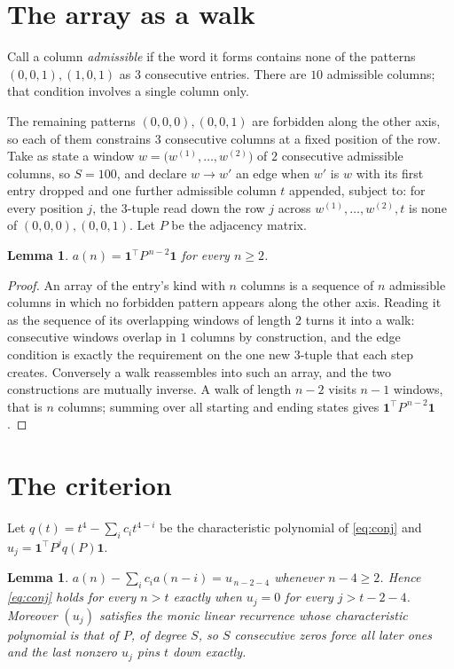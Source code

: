 \documentclass[11pt,a4paper]{article}
\theoremstyle{plain}
\newtheorem{lemma}[theorem]{Lemma}
\theoremstyle{definition}
\begin{document}
\section{The array as a walk}

Call a column \emph{admissible} if the word it forms contains none of the patterns
$(0,0,1), (1,0,1)$ as $3$ consecutive entries. There are $10$ admissible columns; that condition
involves a single column only.

The remaining patterns $(0,0,0), (0,0,1)$ are forbidden along the other axis, so each of them
constrains $3$ consecutive columns at a fixed position of the row. Take as state a
window $w=\bigl(w^{(1)},\dots,w^{(2)}\bigr)$ of $2$ consecutive admissible
columns, so $S=100$, and declare $w\to w'$ an edge when $w'$ is $w$ with its first entry
dropped and one further admissible column $t$ appended, subject to: for every position
$j$, the $3$-tuple read down the row $j$ across $w^{(1)},\dots,w^{(2)},t$
is none of $(0,0,0), (0,0,1)$. Let $P$ be the adjacency matrix.

\begin{lemma}\label{lem:walk}
$a(n)=\mathbf{1}^{\!\top}P^{\,n-2}\mathbf{1}$ for every $n\ge2$.
\end{lemma}

\begin{proof}
An array of the entry's kind with $n$ columns is a sequence of $n$ admissible columns in
which no forbidden pattern appears along the other axis. Reading it as the sequence of its
overlapping windows of length $2$ turns it into a walk: consecutive windows overlap in
$1$ columns by construction, and the edge condition is exactly the requirement on the one
new $3$-tuple that each step creates. Conversely a walk reassembles into such an array,
and the two constructions are mutually inverse. A walk of length $n-2$ visits $n-1$
windows, that is $n$ columns; summing over all starting and ending states gives
$\mathbf{1}^{\!\top}P^{\,n-2}\mathbf{1}$.
\end{proof}

\section{The criterion}

Let $q(t)=t^{4}-\sum_i c_i t^{4-i}$ be the characteristic polynomial of
\eqref{eq:conj} and $u_j=\mathbf{1}^{\!\top}P^{j}q(P)\mathbf{1}$.

\begin{lemma}\label{lem:crit}
$a(n)-\sum_i c_i a(n-i)=u_{\,n-2-4}$ whenever $n-4\ge2$. Hence
\eqref{eq:conj} holds for every $n>t$ exactly when $u_j=0$ for every
$j>t-2-4$. Moreover $(u_j)$ satisfies the monic linear recurrence whose
characteristic polynomial is that of $P$, of degree $S$, so $S$ consecutive zeros force all
later ones and the last nonzero $u_j$ pins $t$ down exactly.
\end{lemma}
\end{document}
